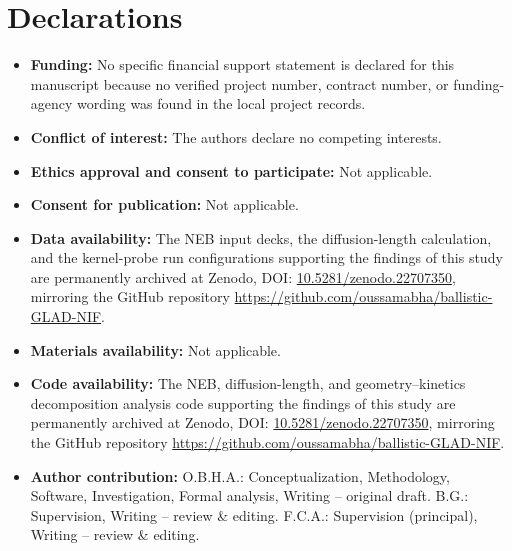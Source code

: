\documentclass[aip,jcp,amsmath,amssymb,reprint]{revtex4-1}
\begin{document}
\section*{Declarations}

\begin{itemize}
\item \textbf{Funding:} No specific financial support statement is declared
  for this manuscript because no verified project number, contract number, or
  funding-agency wording was found in the local project records.
\item \textbf{Conflict of interest:} The authors declare no competing interests.
\item \textbf{Ethics approval and consent to participate:} Not applicable.
\item \textbf{Consent for publication:} Not applicable.
\item \textbf{Data availability:} The NEB input decks, the diffusion-length
  calculation, and the kernel-probe run configurations supporting the
  findings of this study are permanently archived at Zenodo,
  DOI: \href{https://doi.org/10.5281/zenodo.22707350}{10.5281/zenodo.22707350}, mirroring the GitHub repository
  \url{https://github.com/oussamabha/ballistic-GLAD-NIF}.
\item \textbf{Materials availability:} Not applicable.
\item \textbf{Code availability:} The NEB, diffusion-length, and
  geometry--kinetics decomposition analysis code supporting the findings of
  this study are permanently archived at Zenodo, DOI: \href{https://doi.org/10.5281/zenodo.22707350}{10.5281/zenodo.22707350},
  mirroring the GitHub repository \url{https://github.com/oussamabha/ballistic-GLAD-NIF}.
\item \textbf{Author contribution:} O.B.H.A.: Conceptualization, Methodology,
  Software, Investigation, Formal analysis, Writing -- original draft. B.G.:
  Supervision, Writing -- review \& editing. F.C.A.: Supervision (principal),
  Writing -- review \& editing.
\end{itemize}



\end{document}
